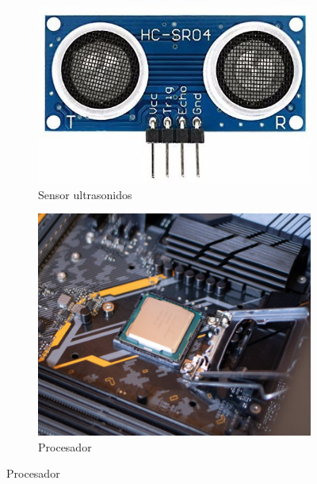 \begin{figure}[h]
\begin{subfigure}{.5\textwidth}
  \centering
  \includegraphics[width=.6\linewidth]{chapters/images/us.jpg}  
  \caption{Sensor ultrasonidos}
  \label{fig:sub-first}
\end{subfigure}
\begin{subfigure}{.5\textwidth}
  \centering
  \includegraphics[width=.6\linewidth]{chapters/images/procesador.png}  
  \caption{Procesador}
  \label{fig:sub-second}
\end{subfigure}



\end{figure}
